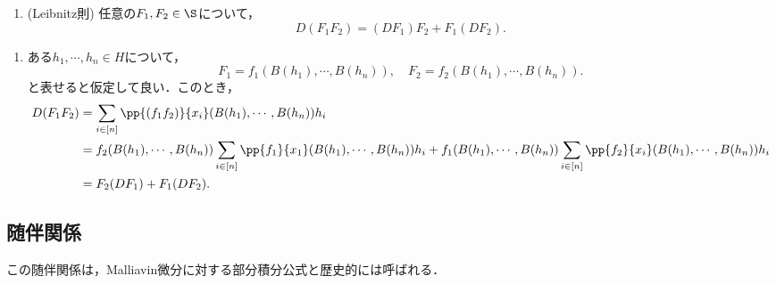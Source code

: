 \documentclass[uplatex,dvipdfmx]{jsreport}
\begin{document}
\begin{lemma}\mbox{}
    \begin{enumerate}
        \item (Leibnitz則) 任意の$F_1,F_2\in\S$について，
        \[D(F_1F_2)=(DF_1)F_2+F_1(DF_2).\]
    \end{enumerate}
\end{lemma}
\begin{Proof}\mbox{}
    \begin{enumerate}
        \item ある$h_1,\cdots,h_n\in H$について，
        \[F_1=f_1(B(h_1),\cdots,B(h_n)),\quad F_2=f_2(B(h_1),\cdots,B(h_n)).\]
        と表せると仮定して良い．このとき，
        \begin{align*}
            D(F_1F_2)&=\sum_{i\in[n]}\pp{(f_1f_2)}{x_i}(B(h_1),\cdots,B(h_n))h_i\\
            &=f_2(B(h_1),\cdots,B(h_n))\sum_{i\in[n]}\pp{f_1}{x_1}(B(h_1),\cdots,B(h_n))h_i+f_1(B(h_1),\cdots,B(h_n))\sum_{i\in[n]}\pp{f_2}{x_i}(B(h_1),\cdots,B(h_n))h_i\\
            &=F_2(DF_1)+F_1(DF_2).
        \end{align*}
    \end{enumerate}
\end{Proof}

\subsection{随伴関係}

\begin{tcolorbox}[colframe=ForestGreen, colback=ForestGreen!10!white,breakable,colbacktitle=ForestGreen!40!white,coltitle=black,fonttitle=\bfseries\sffamily,
title=]
    この随伴関係は，Malliavin微分に対する部分積分公式と歴史的には呼ばれる．
\end{tcolorbox}
\end{document}
